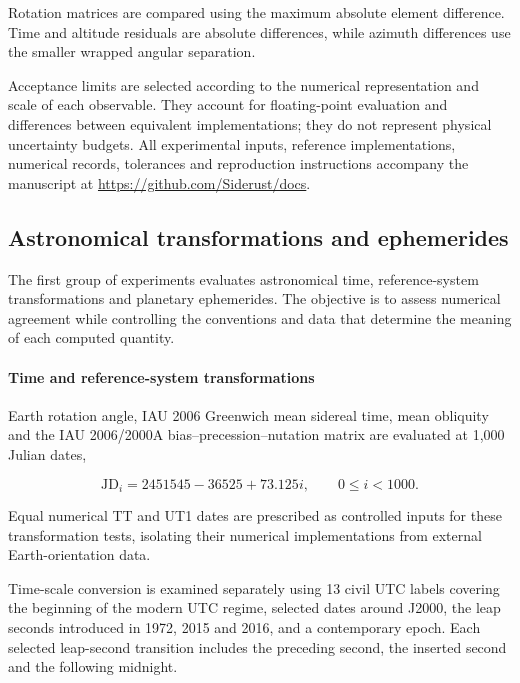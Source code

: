 Rotation matrices are compared using the maximum absolute element difference. Time and altitude
residuals are absolute differences, while azimuth differences use the smaller wrapped angular
separation.

Acceptance limits are selected according to the numerical representation and scale of each
observable. They account for floating-point evaluation and differences between equivalent
implementations; they do not represent physical uncertainty budgets. All experimental inputs,
reference implementations, numerical records, tolerances and reproduction instructions accompany
the manuscript at \url{https://github.com/Siderust/docs}.

\subsection{Astronomical transformations and ephemerides}
\label{sec:ephemeris-method}

The first group of experiments evaluates astronomical time, reference-system transformations and
planetary ephemerides. The objective is to assess numerical agreement while controlling the
conventions and data that determine the meaning of each computed quantity.

\paragraph{Time and reference-system transformations}

Earth rotation angle, IAU 2006 Greenwich mean sidereal time, mean obliquity and the IAU 2006/2000A
bias--precession--nutation matrix are evaluated at 1,000 Julian dates,

\begin{equation}
    \mathrm{JD}_i =
    2451545-36525+73.125i,
    \qquad 0\leq i<1000.
\end{equation}

Equal numerical TT and UT1 dates are prescribed as controlled inputs for these transformation
tests, isolating their numerical implementations from external Earth-orientation data.

Time-scale conversion is examined separately using 13 civil UTC labels covering the beginning of
the modern UTC regime, selected dates around J2000, the leap seconds introduced in 1972, 2015 and
2016, and a contemporary epoch. Each selected leap-second transition includes the preceding second,
the inserted second and the following midnight.

